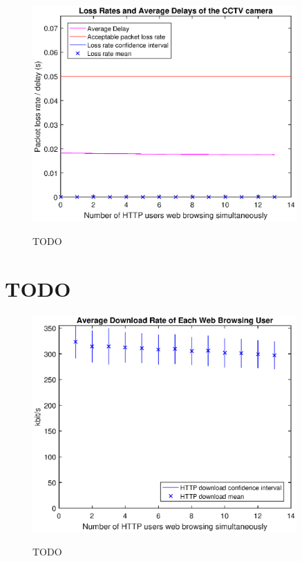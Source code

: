 \documentclass[a4paper,10pt]{book}\usepackage{graphicx}
\begin{document}
\begin{figure}[!ht]
  \centering
    \includegraphics[width=0.9\textwidth]{on_loss_cctv.eps}
    \label{fig:on_loss_cctv}
    \caption{TODO}
\end{figure}


\section{TODO}
\begin{figure}[!ht]
  \centering
    \includegraphics[width=0.9\textwidth]{on_http_download.eps}
    \label{fig:on_http_download}
    \caption{TODO}
\end{figure}
\end{document}
